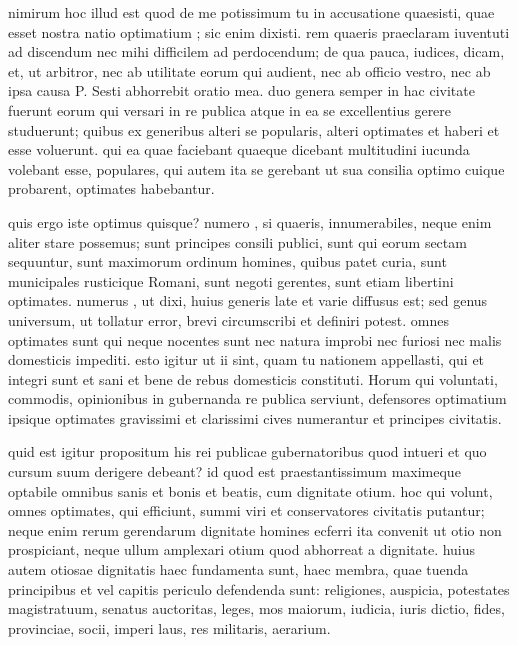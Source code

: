  nimirum hoc illud est quod de me potissimum tu in accusatione quaesisti, quae esset nostra natio optimatium ; sic enim dixisti. rem quaeris praeclaram iuventuti ad discendum nec mihi difficilem ad perdocendum; de qua pauca, iudices, dicam, et, ut arbitror, nec ab utilitate eorum qui audient, nec ab officio vestro, nec ab ipsa causa P. Sesti abhorrebit oratio mea. duo genera semper in hac civitate fuerunt eorum qui versari in re publica atque in ea se excellentius gerere studuerunt; quibus ex generibus alteri se popularis, alteri optimates et haberi et esse voluerunt. qui ea quae faciebant quaeque dicebant multitudini iucunda volebant esse, populares, qui autem ita se gerebant ut sua consilia optimo cuique probarent, optimates habebantur.

 quis ergo iste optimus quisque? numero , si quaeris, innumerabiles, neque enim aliter stare possemus; sunt principes consili publici, sunt qui eorum sectam sequuntur, sunt maximorum ordinum homines, quibus patet curia, sunt municipales rusticique Romani, sunt negoti gerentes, sunt etiam libertini optimates. numerus , ut dixi, huius generis late et varie diffusus est; sed genus universum, ut tollatur error, brevi circumscribi et definiri potest. omnes optimates sunt qui neque nocentes sunt nec natura improbi nec furiosi nec malis domesticis impediti. esto igitur ut ii sint, quam tu nationem appellasti, qui et integri sunt et sani et bene de rebus domesticis constituti. Horum qui voluntati, commodis, opinionibus in gubernanda re publica serviunt, defensores optimatium ipsique optimates gravissimi et clarissimi cives numerantur et principes civitatis.

 quid est igitur propositum his rei publicae gubernatoribus quod intueri et quo cursum suum derigere debeant? id quod est praestantissimum maximeque optabile omnibus sanis et bonis et beatis, cum dignitate otium. hoc qui volunt, omnes optimates, qui efficiunt, summi viri et conservatores civitatis putantur; neque enim rerum gerendarum dignitate homines ecferri ita convenit ut otio non prospiciant, neque ullum amplexari otium quod abhorreat a dignitate. huius autem otiosae dignitatis haec fundamenta sunt, haec membra, quae tuenda principibus et vel capitis periculo defendenda sunt: religiones, auspicia, potestates magistratuum, senatus auctoritas, leges, mos maiorum, iudicia, iuris dictio, fides, provinciae, socii, imperi laus, res militaris, aerarium.

